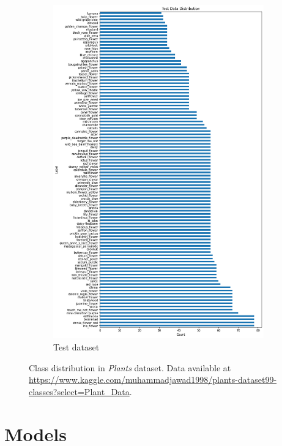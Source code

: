 \begin{figure}[ht]
\begin{subfigure}{.4\textwidth}
    \includegraphics[width=\textwidth]{appendixes/images/plants-test.png}
    \caption{Test dataset}
\end{subfigure}

 \caption{Class distribution in \textit{Plants}\cite{plants-dataset} dataset. Data available at \url{https://www.kaggle.com/muhammadjawad1998/plants-dataset99-classes?select=Plant_Data}.}
\end{figure}

\FloatBarrier

\section{Models}\label{appendix:models:scores}

